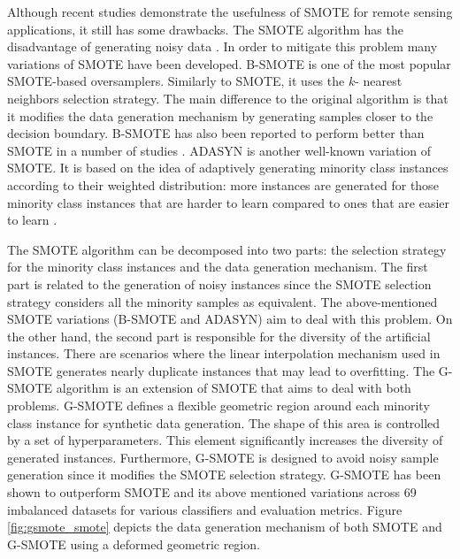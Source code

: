 \documentclass[remotesensing,article,submit,moreauthors,pdftex]{Definitions/mdpi}
\begin{document}
Although recent studies demonstrate the usefulness of SMOTE for remote sensing
applications, it still has some drawbacks. The SMOTE algorithm has the
disadvantage of generating noisy data \cite{Douzas2017}. In order to mitigate
this problem many variations of SMOTE have been developed. B-SMOTE is one of
the most popular SMOTE-based oversamplers. Similarly to SMOTE, it uses the $k$-
nearest neighbors selection strategy. The main difference to the original
algorithm is that it modifies the data generation mechanism by generating
samples closer to the decision boundary. B-SMOTE has also been reported to
perform better than SMOTE in a number of studies \cite{Nguyen2009,
Ramentol2012}. ADASYN is another well-known variation of SMOTE. It is based on
the idea of adaptively generating minority class instances according to their
weighted distribution: more instances are generated for those minority class
instances that are harder to learn compared to ones that are easier to learn
\cite{HaiboHe2008}.

The SMOTE algorithm can be decomposed into two parts: the selection strategy
for the minority class instances and the data generation mechanism. The first
part is related to the generation of noisy instances since the SMOTE selection
strategy considers all the minority samples as equivalent. The above-mentioned
SMOTE variations (B-SMOTE and ADASYN) aim to deal with this problem. On the
other hand, the second part is responsible for the diversity of the artificial
instances. There are scenarios where the linear interpolation mechanism used in
SMOTE generates nearly duplicate instances that may lead to overfitting. The G-
SMOTE algorithm is an extension of SMOTE that aims to deal with both problems.
G-SMOTE defines a flexible geometric region around each minority class instance
for synthetic data generation. The shape of this area is controlled by a set of
hyperparameters. This element significantly increases the diversity of
generated instances. Furthermore, G-SMOTE is designed to avoid noisy sample
generation since it modifies the SMOTE selection strategy. G-SMOTE has been
shown to outperform SMOTE and its above  mentioned variations across 69
imbalanced datasets for various classifiers and evaluation metrics. Figure
\ref{fig:gsmote_smote} depicts the data generation mechanism of both SMOTE and
G-SMOTE using a deformed geometric region.
\end{document}
